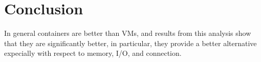 \section{Conclusion}
In general containers are better than VMs, and results from this analysis show that they are significantly better, in particular, they provide a better alternative expecially with respect to memory, I/O, and connection.